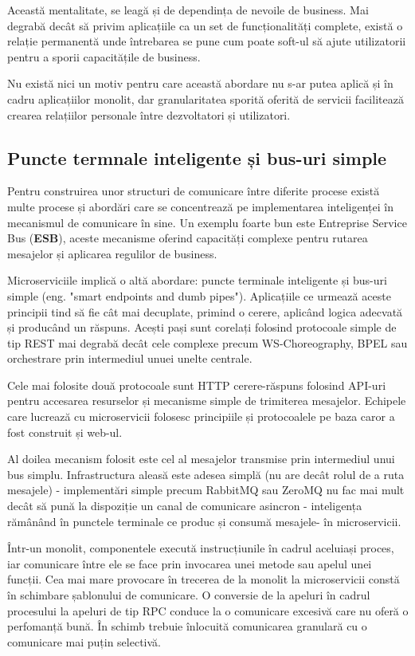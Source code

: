 \documentclass[12pt, a4paper, oneside, romanian]{teza-upb}
\begin{document}
Această mentalitate, se leagă și de dependința de nevoile de business. Mai degrabă decât să privim aplicațiile ca un set de funcționalități complete, există o relație permanentă unde întrebarea se pune cum poate soft-ul să ajute utilizatorii pentru a sporii capacitățile de business.

Nu există nici un motiv pentru care această abordare nu s-ar putea aplică și în cadru aplicațiilor monolit, dar granularitatea sporită oferită de servicii facilitează crearea relațiilor personale între dezvoltatori și utilizatori.

\subsection{Puncte termnale inteligente și bus-uri simple}

Pentru construirea unor structuri de comunicare între diferite procese există multe procese și abordări care se concentrează pe implementarea inteligenței în mecanismul de comunicare în sine. Un exemplu foarte bun este Entreprise Service Bus (\textbf{ESB}), aceste mecanisme oferind capacități complexe pentru rutarea mesajelor și aplicarea regulilor de business.

Microserviciile implică o altă abordare: puncte terminale inteligente și bus-uri simple (eng. "smart endpoints and dumb pipes"). Aplicațiile ce urmează aceste principii tind să fie cât mai decuplate, primind o cerere, aplicând logica adecvată și producând un răspuns. Acești pași sunt corelați folosind protocoale simple de tip REST mai degrabă decât cele complexe precum WS-Choreography, BPEL sau orchestrare prin intermediul unuei unelte centrale. 

Cele mai folosite două protocoale sunt HTTP cerere-răspuns folosind API-uri pentru accesarea resurselor și mecanisme simple de trimiterea mesajelor. Echipele care lucrează cu microservicii folosesc principiile și protocoalele pe baza caror a fost construit și web-ul. 

Al doilea mecanism folosit este cel al mesajelor transmise prin intermediul unui bus simplu. Infrastructura aleasă este adesea simplă (nu are decât rolul de a ruta mesajele) - implementări simple precum RabbitMQ sau ZeroMQ nu fac mai mult decât să pună la dispoziție un canal de comunicare asincron - inteligența rămânând în punctele terminale ce produc și consumă mesajele- în microservicii.

Într-un monolit, componentele execută instrucțiunile în cadrul aceluiași proces, iar comunicare între ele se face prin invocarea unei metode sau apelul unei funcții. Cea mai mare provocare în trecerea de la monolit la microservicii constă în schimbare șablonului de comunicare. O conversie de la apeluri în cadrul procesului la apeluri de tip RPC conduce la o comunicare excesivă care nu oferă o perfomanță bună. În schimb trebuie înlocuită comunicarea granulară cu o comunicare mai puțin selectivă.    
\end{document}
